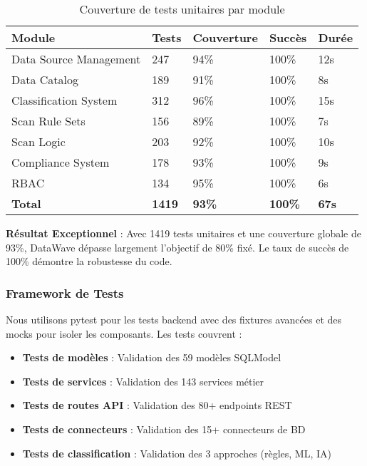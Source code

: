 \begin{table}[htpb]
\centering
\caption{Couverture de tests unitaires par module}
\label{tab:couverture_tests}
\begin{tabular}{|p{}|p{}|p{}|p{}|p{}|}
\hline
\textbf{Module} & \textbf{Tests} & \textbf{Couverture} & \textbf{Succès} & \textbf{Durée} \\
\hline
Data Source Management & 247 & 94\% & 100\% & 12s \\
\hline
Data Catalog & 189 & 91\% & 100\% & 8s \\
\hline
Classification System & 312 & 96\% & 100\% & 15s \\
\hline
Scan Rule Sets & 156 & 89\% & 100\% & 7s \\
\hline
Scan Logic & 203 & 92\% & 100\% & 10s \\
\hline
Compliance System & 178 & 93\% & 100\% & 9s \\
\hline
RBAC & 134 & 95\% & 100\% & 6s \\
\hline
\textbf{Total} & \textbf{1419} & \textbf{93\%} & \textbf{100\%} & \textbf{67s} \\
\hline
\end{tabular}
\end{table}

\textbf{Résultat Exceptionnel} : Avec 1419 tests unitaires et une couverture globale de 93\%, DataWave dépasse largement l'objectif de 80\% fixé. Le taux de succès de 100\% démontre la robustesse du code.

\subsubsection{Framework de Tests}

Nous utilisons pytest pour les tests backend avec des fixtures avancées et des mocks pour isoler les composants. Les tests couvrent :
\begin{itemize}
    \item \textbf{Tests de modèles} : Validation des 59 modèles SQLModel
    \item \textbf{Tests de services} : Validation des 143 services métier
    \item \textbf{Tests de routes API} : Validation des 80+ endpoints REST
    \item \textbf{Tests de connecteurs} : Validation des 15+ connecteurs de BD
    \item \textbf{Tests de classification} : Validation des 3 approches (règles, ML, IA)
\end{itemize}

